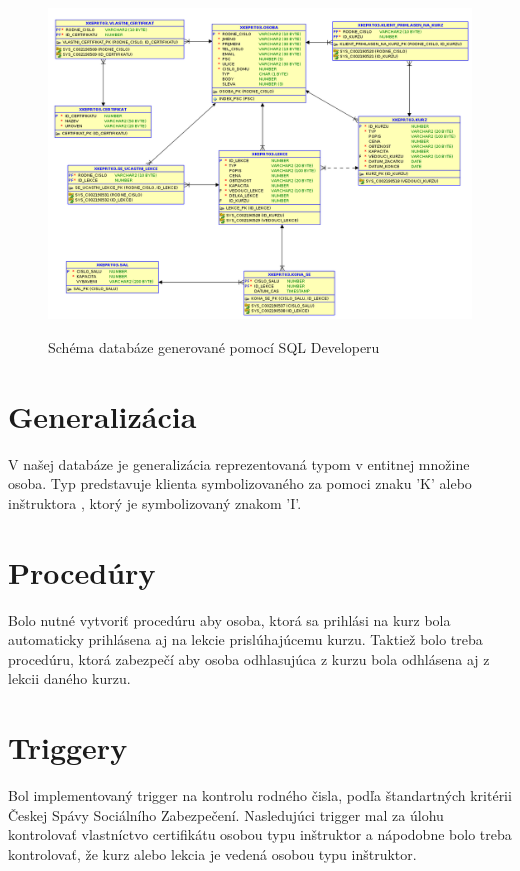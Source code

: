 \documentclass[11pt]{article}
\begin{document}
\begin{figure}[ht]
    \caption{Schéma databáze generované pomocí SQL Developeru}    
    \includegraphics[scale=.538]{schema_DB.png}    
    \label{lopata}
\end{figure}
\restoregeometry

\section{Generalizácia}
V našej databáze je generalizácia reprezentovaná typom v entitnej množine osoba.
Typ predstavuje klienta symbolizovaného za pomoci znaku 'K' alebo inštruktora , ktorý je symbolizovaný
znakom 'I'. 

\section{Procedúry}
Bolo nutné vytvoriť procedúru aby osoba, ktorá sa prihlási na kurz bola automaticky
prihlásena aj na lekcie prislúhajúcemu kurzu. Taktiež bolo treba procedúru, ktorá zabezpečí aby osoba odhlasujúca z kurzu bola
odhlásena aj z lekcii daného kurzu. 

\section{Triggery}
Bol implementovaný trigger na kontrolu rodného čisla, podľa štandartných kritérii Českej Spávy 
Sociálního Zabezpečení. Nasledujúci trigger mal za úlohu kontrolovať vlastníctvo certifikátu osobou typu inštruktor a 
nápodobne bolo treba kontrolovať, že kurz alebo lekcia je vedená osobou typu inštruktor.
\end{document}
